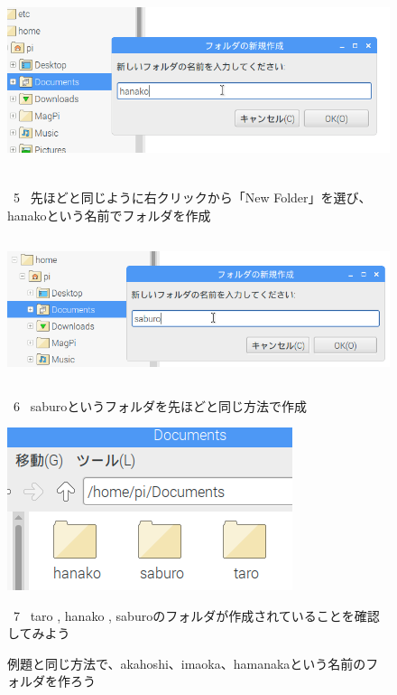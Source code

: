 \documentclass[a4paper,12pt]{jarticle}
\begin{document}
\begin{figure}
  \\
  \vspace{10mm}
  \centering
  \includegraphics[width=14.289cm,height=5.431cm]{textbook-img041.png}
  \begin{minipage}{\textwidth}
    \ 5
    \ 先ほどと同じように右クリックから「New Folder」を選び、hanakoという名前でフォルダを作成
  \end{minipage}

  \centering
  \includegraphics[width=13.884cm,height=4.189cm]{textbook-img042.png}
  \begin{minipage}{\textwidth}
    \ 6
    \ saburoというフォルダを先ほどと同じ方法で作成
  \end{minipage}

  \centering
  \includegraphics[width=8.359cm,height=4.761cm]{textbook-img043.png}
  \begin{minipage}{\textwidth}
    \ 7 \ taro , hanako ,
    saburoのフォルダが作成されていることを確認してみよう
  \end{minipage}
  \vspace{10mm}
  \flushleft
  \theQuestion\label{Q:hasAnswer02-1}

  例題と同じ方法で、akahoshi、imaoka、hamanakaという名前のフォルダを作ろう

\end{figure}
\clearpage
{}
\end{document}
